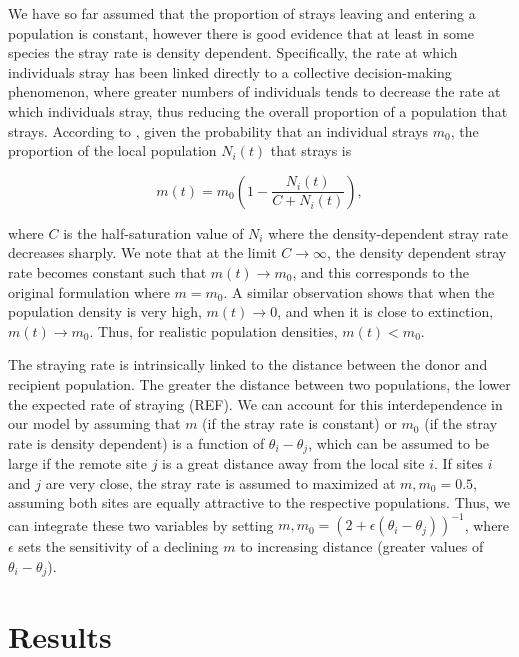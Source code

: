 \documentclass[twocolumn,preprintnumbers,amsmath,amssymb,superscriptaddress]{revtex4}
\begin{document}
We have so far assumed that the proportion of strays leaving and entering a population is constant, however there is good evidence that at least in some species the stray rate is density dependent.
Specifically, the rate at which individuals stray has been linked directly to a collective decision-making phenomenon, where greater numbers of individuals tends to decrease the rate at which individuals stray, thus reducing the overall proportion of a population that strays.
According to \citeauthor{Berdahl:2016dx}, given the probability that an individual strays $m_0$, the proportion of the local population $N_i(t)$ that strays is

\begin{equation}
  m(t) = m_0\left(1- \frac{N_i(t)}{C+N_i(t)}\right),
  \label{eq:ddm}
\end{equation}

\noindent where $C$ is the half-saturation value of $N_i$ where the density-dependent stray rate decreases sharply.
We note that at the limit $C\rightarrow \infty$, the density dependent stray rate becomes constant such that $m(t) \rightarrow m_0$, and this corresponds to the original formulation where $m=m_0$.
A similar observation shows that when the population density is very high, $m(t) \rightarrow 0$, and when it is close to extinction, $m(t) \rightarrow m_0$.
Thus, for realistic population densities, $m(t) < m_0$.


The straying rate is intrinsically linked to the distance between the donor and recipient population.
The greater the distance between two populations, the lower the expected rate of straying (REF).
We can account for this interdependence in our model by assuming that $m$ (if the stray rate is constant) or $m_0$ (if the stray rate is density dependent) is a function of $\theta_i-\theta_j$, which can be assumed to be large if the remote site $j$ is a great distance away from the local site $i$.
If sites $i$ and $j$ are very close, the stray rate is assumed to maximized at $m,m_0 = 0.5$, assuming both sites are equally attractive to the respective populations.
Thus, we can integrate these two variables by setting $m,m_0 = (2 + \epsilon (\theta_i-\theta_j))^{-1}$, where $\epsilon$ sets the sensitivity of a declining $m$ to increasing distance (greater values of $\theta_i-\theta_j$).



\section{Results}
\end{document}
